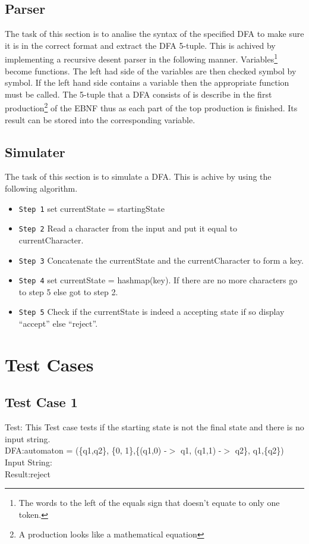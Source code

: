\documentclass[a4paper, 10pt]{article}
\begin{document}
\subsection{Parser}
The task of this section is to analise the syntax of the specified DFA to make sure it is in the correct format and extract the DFA 5-tuple.
This is achived by implementing a recursive desent parser in the following manner. Variables\footnote{The words to the left of the equals sign that doesn't
equate to only one token.} become functions. The left had side of the variables are then checked symbol by symbol. If the left hand side contains a variable
then the appropriate function must be called. The 5-tuple that a DFA consists of is describe in the first production\footnote{A production looks like a 
mathematical equation} of the EBNF thus as each part of the top production is finished. Its result can be stored into the corresponding variable.
\subsection{Simulater}
The task of this section is to simulate a DFA. This is achive by using the following algorithm.
\begin{itemize}
\item \texttt{Step 1} set currentState = startingState
\item \texttt{Step 2} Read a character from the input and put it equal to currentCharacter. 
\item \texttt{Step 3} Concatenate the currentState and the currentCharacter to form a key.
\item \texttt{Step 4} set currentState = hashmap(key). If there are no more characters go to step 5 else got to step 2.
\item \texttt{Step 5} Check if the currentState is indeed a accepting state if so display ``accept'' else ``reject''.
\end{itemize}
\section{Test Cases}
\subsection{Test Case 1}
Test: This Test case tests if the starting state is not the final state and there is no input string.\\
DFA:automaton = (\{q1,q2\}, \{0, 1\},\{(q1,0) -$>$ q1, (q1,1) -$>$ q2\}, q1,\{q2\})\\
Input String:\\
Result:reject\\
\end{document}

